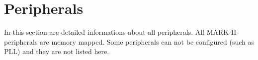 \section{Peripherals}

In this section are detailed informations about all peripherals. All MARK-II
peripherals are memory mapped. Some peripherals can not be configured (such as
PLL) and they are not listed here.


